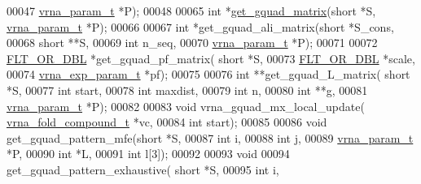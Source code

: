 \begin{DoxyCode}
00047                             \hyperlink{group__energy__parameters_structvrna__param__s}{vrna\_param\_t} *P);
00048 
00065 \textcolor{keywordtype}{int}         *\hyperlink{group__loops_ga392e45c9615aa123737671603fa4203c}{get\_gquad\_matrix}(\textcolor{keywordtype}{short} *S, \hyperlink{group__energy__parameters_structvrna__param__s}{vrna\_param\_t} *P);
00066 
00067 \textcolor{keywordtype}{int}         *get\_gquad\_ali\_matrix(\textcolor{keywordtype}{short} *S\_cons,
00068                                   \textcolor{keywordtype}{short} **S,
00069                                   \textcolor{keywordtype}{int} n\_seq,
00070                                   \hyperlink{group__energy__parameters_structvrna__param__s}{vrna\_param\_t} *P);
00071 
00072 \hyperlink{group__data__structures_ga31125aeace516926bf7f251f759b6126}{FLT\_OR\_DBL}  *get\_gquad\_pf\_matrix( \textcolor{keywordtype}{short} *S,
00073                                   \hyperlink{group__data__structures_ga31125aeace516926bf7f251f759b6126}{FLT\_OR\_DBL} *scale,
00074                                   \hyperlink{group__energy__parameters_structvrna__exp__param__s}{vrna\_exp\_param\_t} *pf);
00075 
00076 \textcolor{keywordtype}{int}         **get\_gquad\_L\_matrix( \textcolor{keywordtype}{short} *S,
00077                                   \textcolor{keywordtype}{int} start,
00078                                   \textcolor{keywordtype}{int} maxdist,
00079                                   \textcolor{keywordtype}{int} n,
00080                                   \textcolor{keywordtype}{int} **g,
00081                                   \hyperlink{group__energy__parameters_structvrna__param__s}{vrna\_param\_t} *P);
00082 
00083 \textcolor{keywordtype}{void}        vrna\_gquad\_mx\_local\_update( \hyperlink{group__fold__compound_structvrna__fc__s}{vrna\_fold\_compound\_t} *vc,
00084                                         \textcolor{keywordtype}{int} start);
00085 
00086 \textcolor{keywordtype}{void}        get\_gquad\_pattern\_mfe(\textcolor{keywordtype}{short} *S,
00087                                   \textcolor{keywordtype}{int} i,
00088                                   \textcolor{keywordtype}{int} j,
00089                                   \hyperlink{group__energy__parameters_structvrna__param__s}{vrna\_param\_t} *P,
00090                                   \textcolor{keywordtype}{int} *L,
00091                                   \textcolor{keywordtype}{int} l[3]);
00092 
00093 \textcolor{keywordtype}{void}
00094 get\_gquad\_pattern\_exhaustive( \textcolor{keywordtype}{short} *S,
00095                               \textcolor{keywordtype}{int} i,

\end{DoxyCode}
